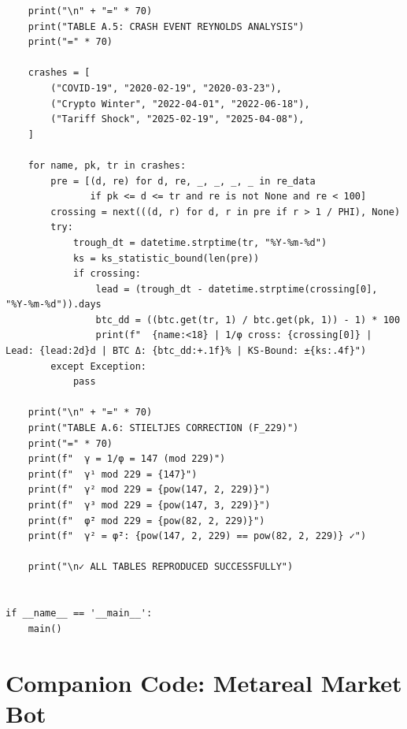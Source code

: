 \begin{verbatim}
    print("\n" + "=" * 70)
    print("TABLE A.5: CRASH EVENT REYNOLDS ANALYSIS")
    print("=" * 70)

    crashes = [
        ("COVID-19", "2020-02-19", "2020-03-23"),
        ("Crypto Winter", "2022-04-01", "2022-06-18"),
        ("Tariff Shock", "2025-02-19", "2025-04-08"),
    ]

    for name, pk, tr in crashes:
        pre = [(d, re) for d, re, _, _, _, _ in re_data
               if pk <= d <= tr and re is not None and re < 100]
        crossing = next(((d, r) for d, r in pre if r > 1 / PHI), None)
        try:
            trough_dt = datetime.strptime(tr, "%Y-%m-%d")
            ks = ks_statistic_bound(len(pre))
            if crossing:
                lead = (trough_dt - datetime.strptime(crossing[0], "%Y-%m-%d")).days
                btc_dd = ((btc.get(tr, 1) / btc.get(pk, 1)) - 1) * 100
                print(f"  {name:<18} | 1/φ cross: {crossing[0]} | Lead: {lead:2d}d | BTC Δ: {btc_dd:+.1f}% | KS-Bound: ±{ks:.4f}")
        except Exception:
            pass

    print("\n" + "=" * 70)
    print("TABLE A.6: STIELTJES CORRECTION (F_229)")
    print("=" * 70)
    print(f"  γ = 1/φ = 147 (mod 229)")
    print(f"  γ¹ mod 229 = {147}")
    print(f"  γ² mod 229 = {pow(147, 2, 229)}")
    print(f"  γ³ mod 229 = {pow(147, 3, 229)}")
    print(f"  φ̄² mod 229 = {pow(82, 2, 229)}")
    print(f"  γ² = φ̄²: {pow(147, 2, 229) == pow(82, 2, 229)} ✓")

    print("\n✓ ALL TABLES REPRODUCED SUCCESSFULLY")


if __name__ == '__main__':
    main()
\end{verbatim}


\section*{Companion Code: Metareal Market Bot}

